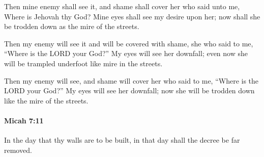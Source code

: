 			\begin{versebox}
					\item[BHS] 
					\item[LXX] 
					\item[ASV] Then mine enemy shall see it, and shame shall cover her who said unto me, Where is Jehovah thy God? Mine eyes shall see my desire upon her; now shall she be trodden down as the mire of the streets.
					\item[NIV] Then my enemy will see it and will be covered with shame, she who said to me, “Where is the LORD your God?” My eyes will see her downfall; even now she will be trampled underfoot like mire in the streets.
					\item[NRSV] Then my enemy will see, and shame will cover her who said to me, “Where is the LORD your God?” My eyes will see her downfall; now she will be trodden down like the mire of the streets.
			\end{versebox}

		\paragraph{Micah 7:11} %
			\label{MICAH-7-11}

			In the day that thy walls are to be built, in that day shall the decree be far removed.

